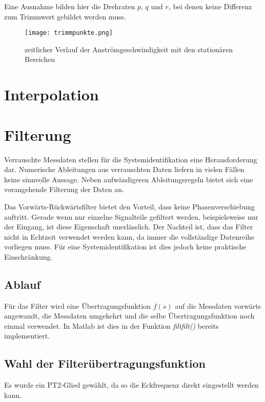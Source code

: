 Eine Ausnahme bilden hier die Drehraten $ p $, $ q $ und $ r $, bei denen keine Differenz zum Trimmwert gebildet werden muss.


\begin{figure}
	\centering
	\texttt{[image: trimmpunkte.png]}
	\caption{zeitlicher Verlauf der Anströmgeschwindigkeit mit den stationären Bereichen}
	\label{fig:trimmpunkte}
\end{figure}




\section{Interpolation} %


\section{Filterung} %

Verrauschte Messdaten stellen für die Systemidentifikation eine Herausforderung dar. Numerische Ableitungen aus verrauschten Daten liefern in vielen Fällen keine sinnvolle Aussage. Neben aufwändigeren Ableitungsregeln bietet sich eine vorangehende Filterung der Daten an.

Das Vorwärts-Rückwärtsfilter bietet den Vorteil, dass keine Phasenverschiebung 
auftritt. Gerade wenn nur einzelne Signalteile gefiltert werden, beispielsweise 
nur der Eingang, ist diese Eigenschaft unerlässlich. Der Nachteil ist, dass das 
Filter nicht in Echtzeit verwendet werden kann, da immer die vollständige 
Datenreihe vorliegen muss. Für eine Systemidentifikation ist dies jedoch keine 
praktische Einschränkung.

\subsection{Ablauf}

Für das Filter wird eine Übertragungsfunktion $f(s)$ auf die Messdaten vorwärts 
angewandt, die Messdaten umgekehrt und die selbe Übertragungsfunktion noch 
einmal verwendet. In Matlab ist dies in der Funktion \textit{filtfilt()} 
bereits implementiert. 

\subsection{Wahl der Filterübertragungsfunktion}

Es wurde ein PT2-Glied gewählt, da so die Eckfrequenz direkt eingestellt werden 
kann. %

